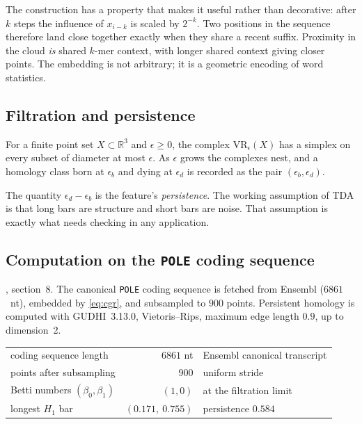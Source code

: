 The construction has a property that makes it useful rather than decorative:
after $k$ steps the influence of $x_{i-k}$ is scaled by $2^{-k}$. Two positions
in the sequence therefore land close together exactly when they share a recent
suffix. Proximity in the cloud \emph{is} shared $k$-mer context, with longer
shared context giving closer points. The embedding is not arbitrary; it is a
geometric encoding of word statistics.

\subsection{Filtration and persistence}

\begin{definition}
For a finite point set $X \subset \mathbb{R}^3$ and $\epsilon \ge 0$, the complex
$\mathrm{VR}_\epsilon(X)$ has a simplex on every subset of diameter at most
$\epsilon$. As $\epsilon$ grows the complexes nest, and a homology class born at
$\epsilon_b$ and dying at $\epsilon_d$ is recorded as the pair
$(\epsilon_b, \epsilon_d)$.
\end{definition}

The quantity $\epsilon_d - \epsilon_b$ is the feature's \emph{persistence}. The
working assumption of TDA is that long bars are structure and short bars are
noise. That assumption is exactly what needs checking in any application.

\subsection{Computation on the \texttt{POLE} coding sequence}

\begin{numerics}[8.1]
, section~8. The canonical \texttt{POLE}
coding sequence is fetched from Ensembl ($6861$~nt), embedded by
\eqref{eq:cgr}, and subsampled to $900$ points. Persistent homology is computed
with GUDHI~3.13.0, Vietoris--Rips, maximum edge length $0.9$, up to dimension~2.

\medskip
\begin{tabularx}{\linewidth}{@{}l r X@{}}
\toprule
coding sequence length & $6861$ nt & Ensembl canonical transcript \\
points after subsampling & $900$ & uniform stride \\
Betti numbers $(\beta_0, \beta_1)$ & $(1, 0)$ & at the filtration limit \\
longest $H_1$ bar & $(0.171,\ 0.755)$ & persistence $0.584$ \\
\bottomrule
\end{tabularx}
\end{numerics}

